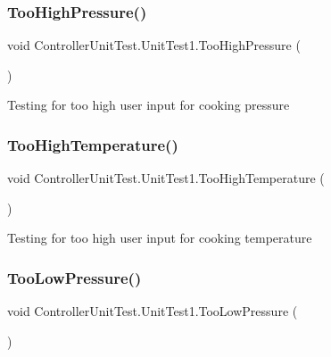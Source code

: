 \subsubsection{\texorpdfstring{Too\+High\+Pressure()}{TooHighPressure()}}
{\footnotesize\ttfamily void Controller\+Unit\+Test.\+Unit\+Test1.\+Too\+High\+Pressure (\begin{DoxyParamCaption}{ }\end{DoxyParamCaption})\hspace{0.3cm}{\ttfamily [inline]}}



Testing for too high user input for cooking pressure 

\mbox{\label{class_controller_unit_test_1_1_unit_test1_ad6301b75ca38599999e9c20b65731595}} 
\subsubsection{\texorpdfstring{Too\+High\+Temperature()}{TooHighTemperature()}}
{\footnotesize\ttfamily void Controller\+Unit\+Test.\+Unit\+Test1.\+Too\+High\+Temperature (\begin{DoxyParamCaption}{ }\end{DoxyParamCaption})\hspace{0.3cm}{\ttfamily [inline]}}



Testing for too high user input for cooking temperature 

\mbox{\label{class_controller_unit_test_1_1_unit_test1_a83cb8833e8eba5a8ca87257234602e6e}} 
\subsubsection{\texorpdfstring{Too\+Low\+Pressure()}{TooLowPressure()}}
{\footnotesize\ttfamily void Controller\+Unit\+Test.\+Unit\+Test1.\+Too\+Low\+Pressure (\begin{DoxyParamCaption}{ }\end{DoxyParamCaption})\hspace{0.3cm}{\ttfamily [inline]}}



